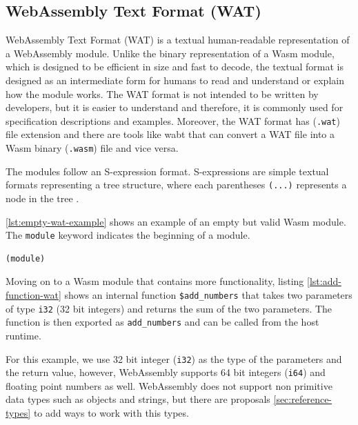 \subsection{WebAssembly Text Format (WAT)}
\label{subsec:wasm-text-format}

WebAssembly Text Format (WAT) \cite{webassemblycommunitygroup_2023_webassembly} is a textual human-readable representation of a \gls{WebAssembly} module. Unlike the binary representation of a Wasm module, which is designed to be efficient in size and fast to decode, the textual format is designed as an intermediate form for humans to read and understand or explain how the module works. The WAT format is not intended to be written by developers, but it is easier to understand and therefore, it is commonly used for specification descriptions and examples. Moreover, the WAT format has (\texttt{.wat}) file extension and there are tools like wabt\cite{webassembly_2020_webassemblywabt} that can convert a WAT file into a Wasm binary (\texttt{.wasm}) file and vice versa.

The modules follow an S-expression format. S-expressions are simple textual formats representing a tree structure, where each parentheses \texttt{(...)} represents a node in the tree \cite{mozillacorporation_2023_understanding}. 

\autoref{lst:empty-wat-example} shows an example of an empty but valid Wasm module. The \texttt{module} keyword indicates the beginning of a module.
%
\begin{lstlisting}[frame=lines, style=Wasm, caption={A WAT file containing an empty module}, showstringspaces=false, captionpos=b, label={lst:empty-wat-example}]
(module)
\end{lstlisting}
%
Moving on to a Wasm module that contains more functionality, listing \ref{lst:add-function-wat} shows an internal function \texttt{\$add\_numbers} that takes two parameters of type \texttt{i32} (32 bit integers) and returns the sum of the two parameters. The function is then exported as \texttt{add\_numbers} and can be called from the host runtime. 

For this example, we use 32 bit integer (\texttt{i32}) as the type of the parameters and the return value, however, WebAssembly supports 64 bit integers (\texttt{i64}) and floating point numbers as well. WebAssembly does not support non primitive data types such as objects and strings, but there are proposals \ref{sec:reference-types} to add ways to work with this types.

